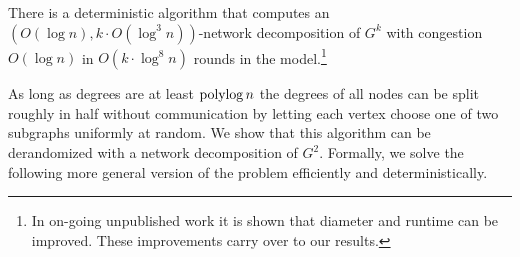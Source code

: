 \begin{theorem}[\cite{RG19}]
\label{thm:rozhon}
There is a deterministic algorithm that computes an $\left(O(\log n),k\cdot O(\log^3n)\right)$-network decomposition of $G^k$ with congestion $O(\log n)$ in $O(k\cdot \log^8 n)$ rounds in the {\congest} model.\footnote{In on-going unpublished work \cite{RG19personal} it is shown that diameter and runtime can be improved. These improvements carry over to our results.}
\end{theorem}

 \label{ssec:derandSplitting}
 

As long as degrees are at least $\operatorname{polylog} n$ the degrees of all nodes can be split roughly in half without communication by letting each vertex choose one of two subgraphs uniformly at random. We show that this algorithm can be derandomized with a network decomposition of $G^2$. 
Formally, we  solve the following more general version of the problem efficiently and deterministically.



